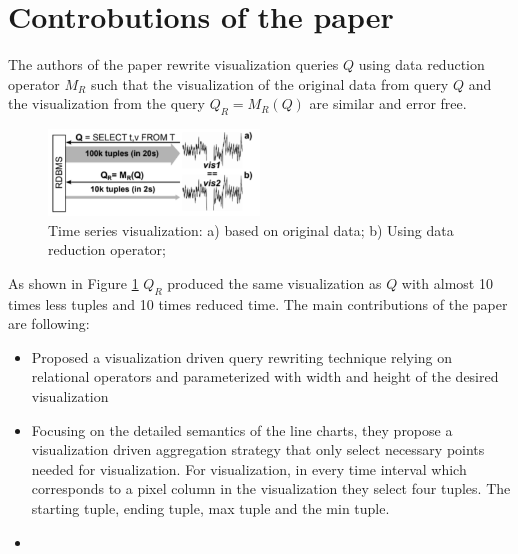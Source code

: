 \section{Controbutions of the paper}
The authors of the paper rewrite visualization queries $Q$ using data reduction operator 
$M_R$ such that the visualization of the original data from query $Q$ and the visualization 
from the query $Q_R = M_R(Q)$ are similar and error free. 
\begin{figure}[h]
	\includegraphics[width=0.5\textwidth]{qr}
	\caption{Time series visualization: a) based on original data; b) Using data reduction operator;}   
	\label{fig:1}
\end{figure}
As shown in Figure \ref{fig:1} $Q_R$ produced the same visualization as $Q$ with almost 10 times less tuples and 10 times reduced time. 
The main contributions of the paper are following:
\begin{itemize}
	\item Proposed a visualization driven query rewriting technique relying on relational operators and parameterized with width and height of the desired visualization
	\item Focusing on the detailed semantics of the line charts, they propose a visualization driven aggregation strategy that only select necessary points needed for visualization. For visualization, in every time interval which corresponds to a pixel column in the visualization they select four tuples. The starting tuple, ending tuple, max tuple and the min tuple. 
	\item 
\end{itemize}

%


